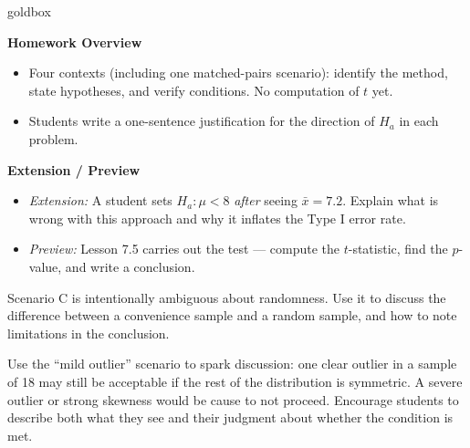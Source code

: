 \documentclass[10pt]{article}
\begin{document}
\begin{skillbox}{goldbox}
\begin{minipage}[t]{0.48\linewidth}
    \textbf{Homework Overview}
    \begin{itemize}
        \item Four contexts (including one matched-pairs scenario): identify the method,
              state hypotheses, and verify conditions. No computation of $t$ yet.
        \item Students write a one-sentence justification for the direction of $H_a$
              in each problem.
    \end{itemize}
\end{minipage}
\hfill
\begin{minipage}[t]{0.48\linewidth}
    \textbf{Extension / Preview}
    \begin{itemize}
        \item \textit{Extension:} A student sets $H_a: \mu < 8$ \emph{after} seeing
              $\bar x = 7.2$. Explain what is wrong with this approach and why it inflates
              the Type I error rate.
        \item \textit{Preview:} Lesson 7.5 carries out the test --- compute the
              $t$-statistic, find the $p$-value, and write a conclusion.
    \end{itemize}
\end{minipage}
\end{skillbox}


\begin{teachernote}
Scenario C is intentionally ambiguous about randomness. Use it to discuss the difference between
a convenience sample and a random sample, and how to note limitations in the conclusion.
\end{teachernote}

\begin{teachernote}
Use the ``mild outlier'' scenario to spark discussion: one clear outlier in a sample of 18
may still be acceptable if the rest of the distribution is symmetric. A severe outlier or
strong skewness would be cause to not proceed. Encourage students to describe both what they
see and their judgment about whether the condition is met.
\end{teachernote}
\end{document}

